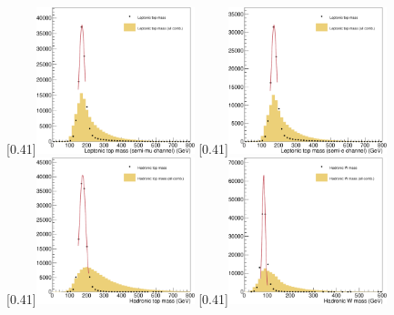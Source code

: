 \begin{figure}[p] \centering
    [0.41\textwidth]{\includegraphics[width=0.41\textwidth]{chapitre6/figs/chi2/chi2_discrimant_combinations_leptonic_top_mass_mu.pdf}} \qquad
    [0.41\textwidth]{\includegraphics[width=0.41\textwidth]{chapitre6/figs/chi2/chi2_discrimant_combinations_leptonic_top_mass_e.pdf}} \\
    [0.41\textwidth]{\includegraphics[width=0.41\textwidth]{chapitre6/figs/chi2/chi2_discrimant_combinations_hadronic_top_mass.pdf}} \qquad
    [0.41\textwidth]{\includegraphics[width=0.41\textwidth]{chapitre6/figs/chi2/chi2_discrimant_combinations_w_mass.pdf}} \\

\end{figure}
